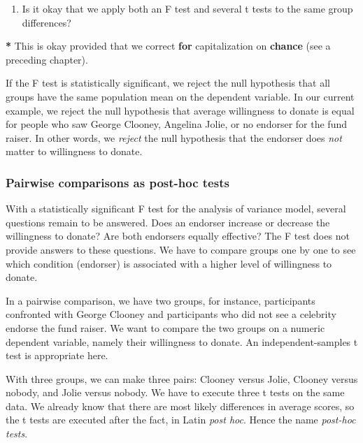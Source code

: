 \documentclass[a4paper]{book}
\newenvironment{Shaded}{\begin{snugshade}}{\end{snugshade}}
\newcommand{\KeywordTok}[1]{\textcolor[rgb]{0,0,0}{\textbf{#1}}}
\newcommand{\StringTok}[1]{\textcolor[rgb]{0.00,0.00,0.00}{#1}}
\newcommand{\ControlFlowTok}[1]{\textcolor[rgb]{0.00,0.00,0.00}{\textbf{#1}}}
\newcommand{\OperatorTok}[1]{\textcolor[rgb]{0.00,0.00,0.00}{\textbf{#1}}}
\newcommand{\NormalTok}[1]{#1}
\providecommand{\tightlist}{%
  \setlength{\itemsep}{0pt}\setlength{\parskip}{0pt}}
\theoremstyle{definition}
\theoremstyle{definition}
\theoremstyle{definition}
\theoremstyle{remark}
\begin{document}
\begin{enumerate}
\def\labelenumi{\arabic{enumi}.}
\setcounter{enumi}{2}
\tightlist
\item
  Is it okay that we apply both an F test and several t tests to the
  same group differences?
\end{enumerate}

\begin{Shaded}
\begin{Highlighting}[]
\OperatorTok{*}\StringTok{ }\NormalTok{This is okay provided that we correct }\ControlFlowTok{for}\NormalTok{ capitalization on }\KeywordTok{chance}\NormalTok{ (see a}
\NormalTok{preceding chapter).}
\end{Highlighting}
\end{Shaded}

If the F test is statistically significant, we reject the null
hypothesis that all groups have the same population mean on the
dependent variable. In our current example, we reject the null
hypothesis that average willingness to donate is equal for people who
saw George Clooney, Angelina Jolie, or no endorser for the fund raiser.
In other words, we \emph{reject} the null hypothesis that the endorser
does \emph{not} matter to willingness to donate.

\subsubsection{Pairwise comparisons as post-hoc
tests}\label{pairwise-comparisons-as-post-hoc-tests}

With a statistically significant F test for the analysis of variance
model, several questions remain to be answered. Does an endorser
increase or decrease the willingness to donate? Are both endorsers
equally effective? The F test does not provide answers to these
questions. We have to compare groups one by one to see which condition
(endorser) is associated with a higher level of willingness to donate.

In a pairwise comparison, we have two groups, for instance, participants
confronted with George Clooney and participants who did not see a
celebrity endorse the fund raiser. We want to compare the two groups on
a numeric dependent variable, namely their willingness to donate. An
independent-samples t test is appropriate here.

With three groups, we can make three pairs: Clooney versus Jolie,
Clooney versus nobody, and Jolie versus nobody. We have to execute three
t tests on the same data. We already know that there are most likely
differences in average scores, so the t tests are executed after the
fact, in Latin \emph{post hoc}. Hence the name \emph{post-hoc tests}.
\end{document}
